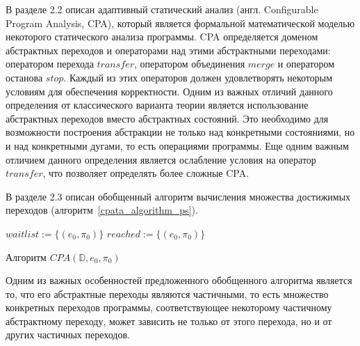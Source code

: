 В разделе 2.2 описан адаптивный статический анализ (англ. Configurable Program Analysis, CPA), который является формальной математической моделью некоторого статического анализа программы.
CPA определяется доменом абстрактных переходов и операторами над этими абстрактными переходами: оператором перехода $transfer$, оператором объединения $merge$ и оператором останова $stop$.
Каждый из этих операторов должен удовлетворять некоторым условиям для обеспечения корректности.
Одним из важных отличий данного определения от классического варианта теории является использование абстрактных переходов вместо абстрактных состояний.
Это необходимо для возможности построения абстракции не только над конкретными состояниями, но и над конкретными дугами, то есть операциями программы.
Еще одним важным отличием данного определения является ослабление условия на оператор $transfer$, что позволяет определять более сложные CPA.

В разделе 2.3 описан обобщенный алгоритм вычисления множества достижимых переходов (алгоритм~\ref{cpata_algorithm_ps}).

\begin{algorithm}
 $waitlist := \{(e_0, \pi_0)\}$\;
 $reached := \{(e_0, \pi_0)\}$\;


 \caption{Алгоритм $CPA(\mathbb{D}, e_0, \pi_0)$}
 \label{cpata_algorithm_ps}
\end{algorithm} 

Одним из важных особенностей предложенного обобщенного алгоритма является то, что его абстрактные переходы являются частичными, то есть множество конкретных переходов программы, соответствующее некоторому частичному абстрактному переходу, может зависить не только от этого перехода, но и от других частичных переходов. 

